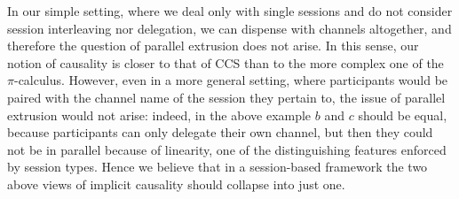 In our simple setting, where we deal only with single sessions and do
not consider session interleaving nor delegation, we can dispense with
channels altogether, and therefore the question of parallel extrusion
does not arise. In this sense, our notion of causality is closer to
that of CCS than to the more complex one of the
$\pi$-calculus. However, even in a more general setting, where
participants would be paired with the channel name of the session they
pertain to, the issue of parallel extrusion would not
arise: indeed, in the above example $b$ and $c$ should be equal,
because participants can only delegate their own channel, but then
they could not be in parallel because of linearity, one of the
distinguishing features enforced by session types. Hence
we believe that in a session-based framework
the two above views of implicit causality should collapse into just
one.

